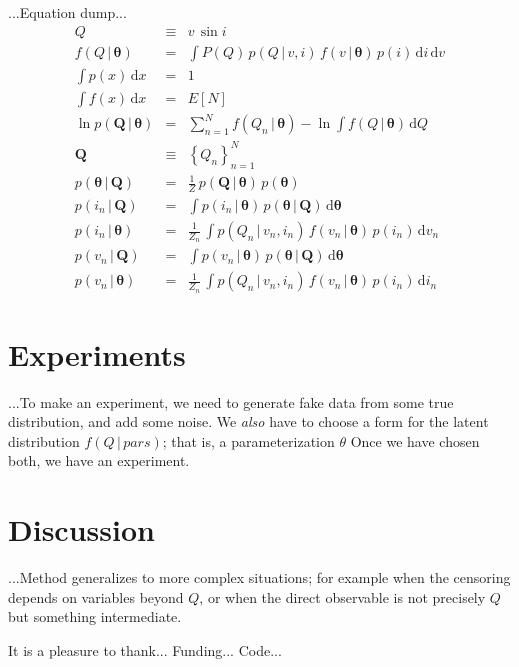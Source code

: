 \documentclass[12pt, preprint]{aastex}
\newcommand{\setof}[1]{\left\{{#1}\right\}}
\newcommand{\given}{\,|\,}
\newcommand{\dd}{\mathrm{d}}
\newcommand{\catalog}{\bm{Q}}
\newcommand{\pars}{\bm{\theta}}
\begin{document}
...Equation dump...
\begin{eqnarray}
Q &\equiv& v\,\sin i
\\
f(Q\given\pars) &=& \int P(Q)\,p(Q\given v,i)\,f(v\given\pars)\,p(i)\,\dd i\,\dd v
\\
\int p(x)\,\dd x &=& 1
\\
\int f(x)\,\dd x &=& E[N]
\\
\ln p(\catalog\given\pars) &=& \sum_{n=1}^N f(Q_n\given\pars) - \ln \int f(Q\given\pars)\,\dd Q
\\
\catalog &\equiv& \setof{Q_n}_{n=1}^N
\\
p(\pars\given\catalog) &=& \frac{1}{Z}\,p(\catalog\given\pars)\,p(\pars)
\\
p(i_n\given\catalog) &=& \int p(i_n\given\pars)\,p(\pars\given\catalog)\,\dd\pars
\\
p(i_n\given\pars) &=& \frac{1}{Z_n}\,\int p(Q_n\given v_n,i_n)\,f(v_n\given\pars)\,p(i_n)\,\dd v_n
\\
p(v_n\given\catalog) &=& \int p(v_n\given\pars)\,p(\pars\given\catalog)\,\dd\pars
\\
p(v_n\given\pars) &=& \frac{1}{Z_n}\,\int p(Q_n\given v_n,i_n)\,f(v_n\given\pars)\,p(i_n)\,\dd i_n
\end{eqnarray}

\section{Experiments}

...To make an experiment, we need to generate fake data from some true
distribution, and add some noise.
We \emph{also} have to choose a form for the latent distribution
$f(Q\given pars)$; that is, a parameterization $\theta$
Once we have chosen both, we have an experiment.

\section{Discussion}

...Method generalizes to more complex situations; for example when the
censoring depends on variables beyond $Q$, or when the direct
observable is not precisely $Q$ but something intermediate.

\acknowledgements
It is a pleasure to thank...
Funding...
Code...
\end{document}
